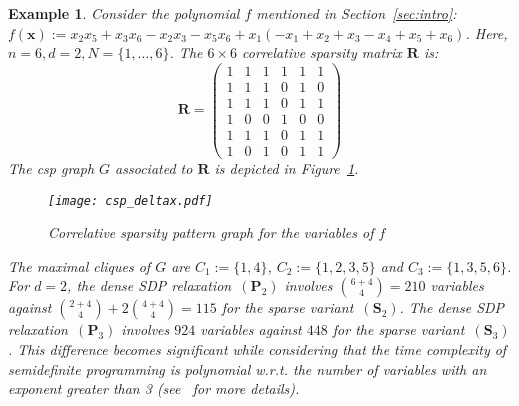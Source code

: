 \documentclass[preprint]{sigplanconf}
\newcommand{\x}{\mathbf{x}}
\def\P{\mathbf{P}}
\def\S{\mathbf{S}}
\def\S{\mathbf{S}}
\theoremstyle{plain}
\newtheorem{example}{Example}
\begin{document}
\begin{example}
\label{ex:sparse}
Consider the polynomial $f$ mentioned in Section~\ref{sec:intro}:
$f(\x) := x_2 x_5 + x_3 x_6 - x_2 x_3  - x_5 x_6 
+ x_1 ( - x_1 +  x_2 +  x_3  - x_4 +  x_5 +  x_6)$.
%
Here, $n = 6, d = 2, N = \{1,\dots, 6 \}$. The $6 \times 6$ correlative sparsity matrix $\mathbf{R}$ is:
\[
\mathbf{R} = 
\begin{pmatrix}
  1 & 1 & 1 & 1 & 1 & 1 \\
  1 & 1 & 1 & 0 & 1 & 0 \\
  1 & 1 & 1 & 0 & 1 & 1 \\
  1 & 0 & 0 & 1 & 0 & 0 \\
  1 & 1 & 1 & 0 & 1 & 1 \\
  1 & 0 & 1 & 0 & 1 & 1 
 \end{pmatrix}
\]
The csp graph $G$ associated to $\mathbf{R}$ is depicted in Figure~\ref{fig:csp_deltax}. 
%
\begin{figure}[!ht]	
\begin{center}
\texttt{[image: csp\_deltax.pdf]}
\caption{Correlative sparsity pattern graph for the variables of $f$}
\label{fig:csp_deltax}
\end{center}
\end{figure}
%
The maximal cliques of $G$ are $C_1 := \{1, 4\}$, $C_2 := \{1, 2, 3, 5\}$ and $C_3 := \{1, 3, 5, 6\}$. For $d=2$, the dense SDP relaxation~$(\P_2)$ involves $\binom{6 + 4}{4} = 210$ variables against $\binom{2 + 4}{4} + 2 \binom{4 + 4}{4} = 115$ for the sparse variant~$(\S_2)$. The dense SDP relaxation~$(\P_3)$ involves $924$ variables against $448$ for the sparse variant~$(\S_3)$. 
This difference becomes significant while considering that the time complexity of semidefinite programming is polynomial w.r.t. the number of variables with an exponent greater than 3 (see~\cite[Chapter 4]{BenTal01} for more details).
\end{example}
%
\end{document}

